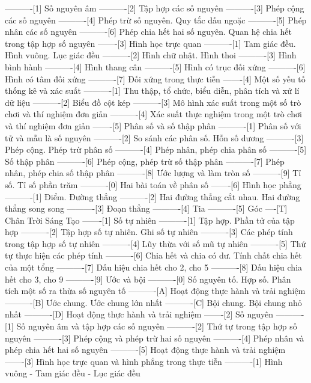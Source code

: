 ----------[1] Số nguyên âm
----------[2] Tập hợp các số nguyên
----------[3] Phép cộng các số nguyên
----------[4] Phép trừ số nguyên. Quy tắc dấu ngoặc
----------[5] Phép nhân các số nguyên
----------[6] Phép chia hết hai số nguyên. Quan hệ chia hết trong tập hợp số nguyên
-------[3] Hình học trực quan
----------[1] Tam giác đều. Hình vuông. Lục giác đều
----------[2] Hình chữ nhật. Hình thoi
----------[3] Hình bình hành
----------[4] Hình thang cân
----------[5] Hình có trục đối xứng
----------[6] Hình có tâm đối xứng
----------[7] Đối xứng trong thực tiễn
-------[4] Một số yếu tố thống kê và xác suất
----------[1] Thu thập, tổ chức, biểu diễn, phân tích và xử lí dữ liệu
----------[2] Biểu đồ cột kép
----------[3] Mô hình xác suất trong một số trò chơi và thí nghiệm đơn giản
----------[4] Xác suất thực nghiệm trong một trò chơi và thí nghiệm đơn giản
-------[5] Phân số và số thập phân
----------[1] Phân số với tử và mẫu là số nguyên
----------[2] So sánh các phân số. Hỗn số dương
----------[3] Phép cộng. Phép trừ phân số
----------[4] Phép nhân, phép chia phân số
----------[5] Số thập phân
----------[6] Phép cộng, phép trừ số thập phân
----------[7] Phép nhân, phép chia số thập phân
----------[8] Ước lượng và làm tròn số
----------[9] Tỉ số. Tỉ số phần trăm
----------[0] Hai bài toán về phân số
-------[6] Hình học phẳng
----------[1] Điểm. Đường thẳng
----------[2] Hai đường thẳng cắt nhau. Hai đường thẳng song song
----------[3] Đoạn thẳng
----------[4] Tia
----------[5] Góc
----[T] Chân Trời Sáng Tạo
-------[1] Số tự nhiên
----------[1] Tập hợp. Phần tử của tập hợp
----------[2] Tập hợp số tự nhiên. Ghi số tự nhiên
----------[3] Các phép tính trong tập hợp số tự nhiên
----------[4] Lũy thừa với số mũ tự nhiên
----------[5] Thứ tự thực hiện các phép tính
----------[6] Chia hết và chia có dư. Tính chất chia hết của một tổng
----------[7] Dấu hiệu chia hết cho 2, cho 5
----------[8] Dấu hiệu chia hết cho 3, cho 9
----------[9] Ước và bội
----------[0] Số nguyên tố. Hợp số. Phân tích một số ra thừa số nguyên tố
----------[A] Hoạt động thực hành và trải nghiệm
----------[B] Ước chung. Ước chung lớn nhất
----------[C] Bội chung. Bội chung nhỏ nhất
----------[D] Hoạt động thực hành và trải nghiệm
-------[2] Số nguyên
----------[1] Số nguyên âm và tập hợp các số nguyên
----------[2] Thứ tự trong tập hợp số nguyên
----------[3] Phép cộng và phép trừ hai số nguyên
----------[4] Phép nhân và phép chia hết hai số nguyên
----------[5] Hoạt động thực hành và trải nghiệm
-------[3] Hình học trực quan và hình phẳng trong thực tiễn
----------[1] Hình vuông - Tam giác đều - Lục giác đều
